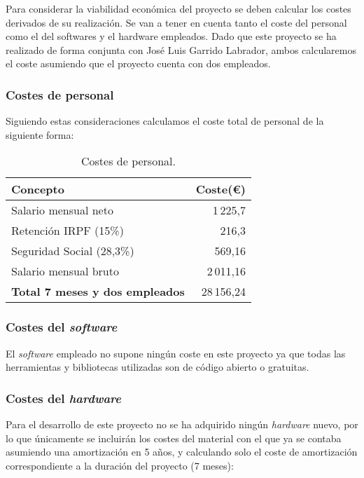 Para considerar la viabilidad económica del proyecto se deben calcular los costes derivados de su realización. Se van a tener en cuenta tanto el coste del personal como el del softwares y el hardware empleados. Dado que este proyecto se ha realizado de forma conjunta con José Luis Garrido Labrador, ambos calcularemos el coste asumiendo que el proyecto cuenta con dos empleados.

\subsubsection{Costes de personal} 

Siguiendo estas consideraciones calculamos el coste total de personal de la siguiente forma: 

\begin{table}[H]
	\centering
	\begin{tabular}[]{@{}l r@{}}
		\toprule
		\textbf{Concepto} & \textbf{Coste(\euro{})} \\
		\midrule
		Salario mensual neto~\cite{salariales} & 1\,225,7 \\
		Retención IRPF (15\%) & 216,3 \\
		Seguridad Social (28,3\%) & 569,16 \\
		Salario mensual bruto & 2\,011,16 \\\hubu
		\textbf{Total 7 meses y dos empleados} &  28\,156,24 \\
		\bottomrule
	\end{tabular}
	\caption{Costes de personal.}
	\label{tab:costes_personal}
\end{table}


\subsubsection{Costes del \textit{software}}

El \textit{software} empleado no supone ningún coste en este proyecto ya que todas las herramientas y bibliotecas utilizadas son de código abierto o gratuitas. 

\subsubsection{Costes del \textit{hardware}}

Para el desarrollo de este proyecto no se ha adquirido ningún \textit{hardware} nuevo, por lo que únicamente se incluirán los costes del material con el que ya se contaba asumiendo una amortización en 5 años, y calculando solo el coste de amortización correspondiente a la duración del proyecto (7 meses): 

